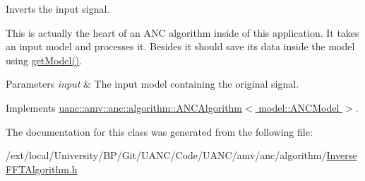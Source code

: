 Inverts the input signal. 

This is actually the heart of an A\+NC algorithm inside of this application. It takes an input model and processes it. Besides it should save its data inside the model using \hyperlink{classuanc_1_1amv_1_1anc_1_1algorithm_1_1_a_n_c_algorithm_a12ce80f6746cbb440cf771fc6878f7cf}{get\+Model()}.


\begin{DoxyParams}{Parameters}
{\em input} & The input model containing the original signal. \\
\hline
\end{DoxyParams}


Implements \hyperlink{classuanc_1_1amv_1_1anc_1_1algorithm_1_1_a_n_c_algorithm_abfdc7f14f7e41e408ee08037a839760d}{uanc\+::amv\+::anc\+::algorithm\+::\+A\+N\+C\+Algorithm$<$ model\+::\+A\+N\+C\+Model $>$}.



The documentation for this class was generated from the following file\+:\begin{DoxyCompactItemize}
\item 
/ext/local/\+University/\+B\+P/\+Git/\+U\+A\+N\+C/\+Code/\+U\+A\+N\+C/amv/anc/algorithm/\hyperlink{_inverse_f_f_t_algorithm_8h}{Inverse\+F\+F\+T\+Algorithm.\+h}\end{DoxyCompactItemize}
